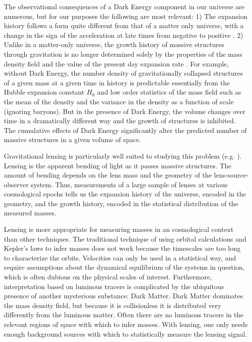 \documentclass[12pt]{article}
\begin{document}
The observational consequences of a Dark Energy component in our universe are
numerous, but for our purposes the following are most relevant: 1) The
expansion history follows a form quite different from that of a matter only
universe, with a change in the sign of the acceleration at late times from
negative to positive \cite{Carroll92}.  2)  Unlike in a matter-only universe,
the growth history of massive structures through gravitation is no longer
determined solely by the properties of the mass density field and the value of
the present day expansion rate \cite{Haiman01}.  For example, without Dark
Energy, the number density of gravitationally collapsed structures of a given
mass at a given time in history is predictable essentially from the Hubble
expansion constant $H_0$ and low order statistics of the mass field such as the
mean of the density and the variance in the density as a function of scale
(ignoring baryons).  But in the presence of Dark Energy, the volume changes
over time in a dramatically different way and the growth of structures is
inhibited.  The cumulative effects of Dark Energy significantly alter the
predicted number of massive structures in a given volume of space.

Gravitational lensing is particularly well suited to studying this problem
(e.g. \cite{Kaiser98,Hu04}).  Lensing is the apparent bending of light as it
passes massive structures.  The amount of bending depends on the lens mass and
the geometry of the lens-source-observer system.  Thus, measurements of a large
sample of lenses at various cosmological epochs tells us the expansion history
of the universe, encoded in the geometry, and the growth history, encoded in
the statistical distribution of the measured masses.  

Lensing is more appropriate for measuring masses in an cosmological context
than other techniques.  The traditional technique of using orbital calculations
and Kepler's laws to infer masses does not work because the timescales are too
long to characterize the orbits. Velocities can only be used in a statistical
way, and require assumptions about the dynamical equilibrium of the systems in
question, which is often dubious on the physical scales of interest.
Furthermore, interpretation based on luminous tracers is complicated by the
ubiquitous presence of another mysterious substance: Dark Matter.  Dark Matter
dominates the mass density field, but because it is collisionless it is
distributed very differently from the luminous matter.  Often there are no
luminous tracers in the relevant regions of space with which to infer masses.
With lensing, one only needs enough background sources with which to
statistically measure the lensing signal.
\end{document}
